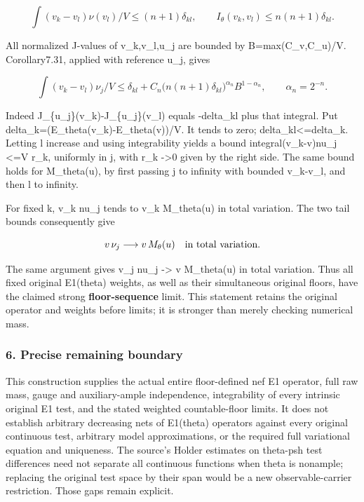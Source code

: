 \documentclass[
  10pt,
]{article}
\begin{document}
\[\int(v_k-v_l)\nu(v_l)/V\leq(n+1)\delta_{kl},\qquad
I_\theta(v_k,v_l)\leq n(n+1)\delta_{kl}.\]

All normalized J-values of v\_k,v\_l,u\_j are bounded by
B=max(C\_v,C\_u)/V. Corollary7.31, applied with reference u\_j, gives

\[\int(v_k-v_l)\nu_j/V\leq\delta_{kl}
+C_n\big(n(n+1)\delta_{kl}\big)^{\alpha_n}B^{1-\alpha_n},
\qquad\alpha_n=2^{-n}.\]

Indeed J\_\{u\_j\}(v\_k)-J\_\{u\_j\}(v\_l) equals -delta\_kl plus that
integral. Put delta\_k=(E\_theta(v\_k)-E\_theta(v))/V. It tends to zero;
delta\_kl\textless=delta\_k. Letting l increase and using integrability
yields a bound integral(v\_k-v)nu\_j \textless=V r\_k, uniformly in j,
with r\_k -\textgreater0 given by the right side. The same bound holds
for M\_theta(u), by first passing j to infinity with bounded v\_k-v\_l,
and then l to infinity.

For fixed k, v\_k nu\_j tends to v\_k M\_theta(u) in total variation.
The two tail bounds consequently give

\[v\,\nu_j\longrightarrow v\,M_\theta(u)
\quad\hbox{in total variation}.\]

The same argument gives v\_j nu\_j -\textgreater{} v M\_theta(u) in
total variation. Thus all fixed original E1(theta) weights, as well as
their simultaneous original floors, have the claimed strong
\textbf{floor-sequence} limit. This statement retains the original
operator and weights before limits; it is stronger than merely checking
numerical mass.

\subsubsection{6. Precise remaining
boundary}\label{precise-remaining-boundary}

This construction supplies the actual entire floor-defined nef E1
operator, full raw mass, gauge and auxiliary-ample independence,
integrability of every intrinsic original E1 test, and the stated
weighted countable-floor limits. It does not establish arbitrary
decreasing nets of E1(theta) operators against every original continuous
test, arbitrary model approximations, or the required full variational
equation and uniqueness. The source's Holder estimates on theta-psh test
differences need not separate all continuous functions when theta is
nonample; replacing the original test space by their span would be a new
observable-carrier restriction. Those gaps remain explicit.
\end{document}
